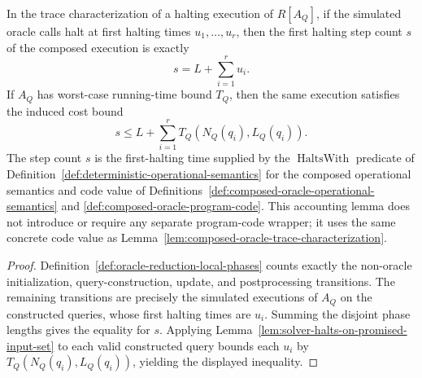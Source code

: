 \begin{lemma}
  \label{lem:composed-oracle-step-count-accounting}
  In the trace characterization of a halting execution of $R[A_Q]$, if the
  simulated oracle calls halt at first halting times $u_1,\ldots,u_r$, then the
  first halting step count $s$ of the composed execution is exactly
  \[
    s=L+\sum_{i=1}^{r}u_i .
  \]
  If $A_Q$ has worst-case running-time bound $T_Q$, then the same execution
  satisfies the induced cost bound
  \[
    s\leq L+\sum_{i=1}^{r}T_Q(N_Q(q_i),L_Q(q_i)).
  \]
  The step count $s$ is the first-halting time supplied by the
  $\operatorname{HaltsWith}$ predicate of
  Definition~\ref{def:deterministic-operational-semantics} for the composed
  operational semantics and code value of
  Definitions~\ref{def:composed-oracle-operational-semantics} and
  \ref{def:composed-oracle-program-code}.  This accounting lemma does not
  introduce or require any separate program-code wrapper; it uses the same
  concrete code value as
  Lemma~\ref{lem:composed-oracle-trace-characterization}.
\end{lemma}
\begin{proof}
  Definition~\ref{def:oracle-reduction-local-phases} counts exactly the
  non-oracle initialization, query-construction, update, and postprocessing
  transitions.  The remaining transitions are precisely the simulated
  executions of $A_Q$ on the constructed queries, whose first halting times are
  $u_i$.  Summing the disjoint phase lengths gives the equality for $s$.
  Applying Lemma~\ref{lem:solver-halts-on-promised-input-set} to each valid
  constructed query bounds each $u_i$ by $T_Q(N_Q(q_i),L_Q(q_i))$, yielding the
  displayed inequality.
\end{proof}

